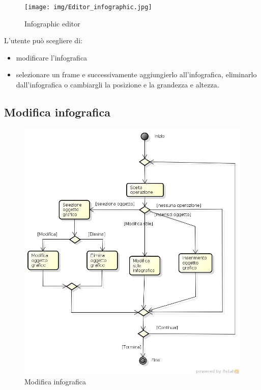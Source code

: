 \begin{figure}[h!]
		\centering
		\texttt{[image: img/Editor\_infographic.jpg]}
		\caption{Infographic editor}
		\label{fig:ModelloSpy}
\end{figure}

L'utente può scegliere di: 
\begin{itemize}
\item modificare l'infografica 
\item selezionare un frame e successivamente aggiungierlo all'infografica, eliminarlo dall'infografica o cambiargli la posizione e la grandezza e altezza.
\end{itemize}

\subsection{Modifica infografica}

\begin{figure}[h!]
		\centering
		\includegraphics[scale=.2]{img/Modifica_infografica.jpg}
		\caption{Modifica infografica}
		\label{fig:ModelloSpy}
\end{figure}


